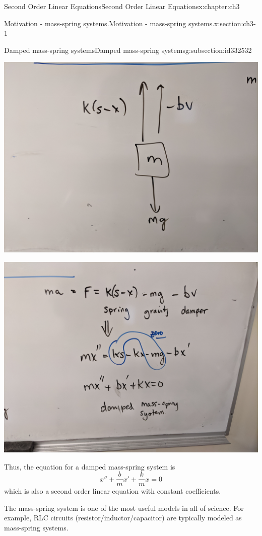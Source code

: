 \documentclass[oneside,10pt,]{book}
\numberwithin{equation}{section}
\numberwithin{equation}{section}
\begin{document}
\begin{chapterptx}{Second Order Linear Equations}{}{Second Order Linear Equations}{}{}{x:chapter:ch3}
\begin{sectionptx}{Motivation - mass-spring systems.}{}{Motivation - mass-spring systems.}{}{}{x:section:ch3-1}
\begin{subsectionptx}{Damped mass-spring systems}{}{Damped mass-spring systems}{}{}{g:subsection:id332532}
\begin{image}{0}{1}{0}
\end{image}%
\begin{image}{0}{1}{0}%
\includegraphics[width=\linewidth]{images/damped2.jpg}
\end{image}%
\begin{image}{0}{1}{0}%
\includegraphics[width=\linewidth]{images/damped3.jpg}
\end{image}%
Thus, the equation for a damped mass-spring system is%
\begin{equation*}
x'' + \frac{b}{m} x' + \frac{k}{m} x = 0
\end{equation*}
which is also a second order linear equation with constant coefficients.%
\par
The mass-spring system is one of the most useful models in all of science. For example, RLC circuits (resistor\slash{}inductor\slash{}capacitor) are typically modeled as mass-spring systems.%

\end{subsectionptx}
\end{sectionptx}
\end{chapterptx}
\end{document}
